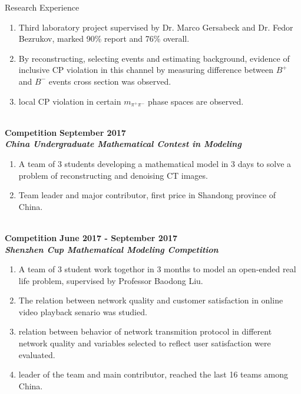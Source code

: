\documentclass{resume} %
\begin{document}
\begin{rSection}{Research Experience}
\begin{enumerate}[leftmargin=*,label=$\bullet$]
            \item   Third laboratory project supervised by Dr. Marco Gersabeck and Dr. Fedor Bezrukov, marked 90\% report and 76\% overall.
            \item   By reconstructing, selecting events and estimating background, evidence of inclusive 
                    CP violation in this channel by measuring difference between $B^{+}$ and $B^{-}$ events cross section was observed.
            \item   local CP violation in certain $m_{\pi^{+}\pi^{-}}$ phase spaces are observed.
        \end{enumerate}
        \ \\[0pt]
        {\bf Competition} \hfill {\bf September 2017}\\
        {\bf \em China Undergraduate Mathematical Contest in Modeling}
        \begin{enumerate}[leftmargin=*,label=$\bullet$]
            \item   A team of 3 students developing a mathematical model in 3 days to solve a problem of reconstructing and 
                    denoising CT images. 
            \item   Team leader and major contributor, first price in Shandong province of China.
        \end{enumerate}
        \ \\[0pt]
        {\bf Competition} \hfill {\bf June 2017 - September 2017}\\
        {\bf \em Shenzhen Cup Mathematical Modeling Competition}
        \begin{enumerate}[leftmargin=*,label=$\bullet$]
            \item   A team of 3 student work togethor in 3 months to model an open-ended real life problem, 
                    supervised by Professor Baodong Liu.
            \item   The relation between network quality and customer satisfaction in online video playback senario was studied.
            \item   relation between behavior of network transmition protocol in different network quality and variables selected 
                    to reflect user satisfaction were evaluated.
            \item   leader of the team and main contributor, reached the last 16 teams among China.
        \end{enumerate}

    \end{rSection}
\end{document}
